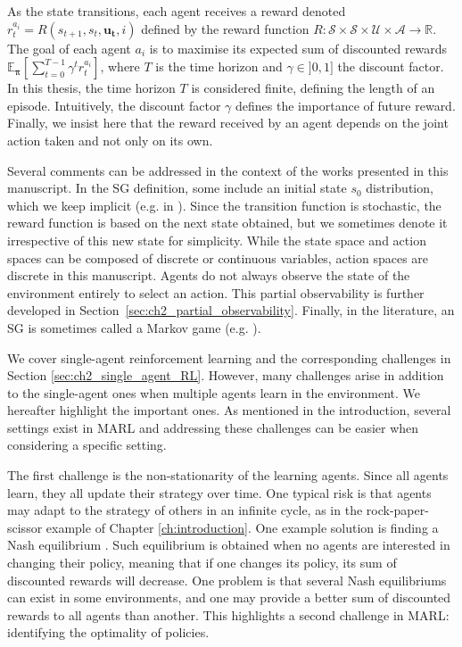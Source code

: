 As the state transitions, each agent receives a reward denoted $r_t^{a_i} = R(s_{t+1}, s_t, \mathbf{u_t}, i)$ defined by the reward function $R: \mathcal{S} \times \mathcal{S} \times \mathcal{U} \times \mathcal{A} \rightarrow \mathbb{R}$.
The goal of each agent $a_i$ is to maximise its expected sum of discounted rewards $\mathbb{E}_{\mathbf{\pi}}\left[ \sum_{t=0}^{T-1} \gamma^t r^{a_i}_t \right]$, where $T$ is the time horizon and $\gamma \in ]0, 1]$ the discount factor.
In this thesis, the time horizon $T$ is considered finite, defining the length of an episode.
Intuitively, the discount factor $\gamma$ defines the importance of future reward.
Finally, we insist here that the reward received by an agent depends on the joint action taken and not only on its own.

Several comments can be addressed in the context of the works presented in this manuscript.
In the SG definition, some include an initial state $s_0$ distribution, which we keep implicit (e.g. in \citep{marl-book}).
Since the transition function is stochastic, the reward function is based on the next state obtained, but we sometimes denote it irrespective of this new state for simplicity.
While the state space and action spaces can be composed of discrete or continuous variables, action spaces are discrete in this manuscript.
Agents do not always observe the state of the environment entirely to select an action.
This partial observability is further developed in Section~\ref{sec:ch2_partial_observability}.
Finally, in the literature, an SG is sometimes called a Markov game (e.g. \citep{MarkovGames}).

We cover single-agent reinforcement learning and the corresponding challenges in Section \ref{sec:ch2_single_agent_RL}.
However, many challenges arise in addition to the single-agent ones when multiple agents learn in the environment.
We hereafter highlight the important ones.
As mentioned in the introduction, several settings exist in MARL and addressing these challenges can be easier when considering a specific setting.

The first challenge is the non-stationarity of the learning agents.
Since all agents learn, they all update their strategy over time.
One typical risk is that agents may adapt to the strategy of others in an infinite cycle, as in the rock-paper-scissor example of Chapter \ref{ch:introduction}.
One example solution is finding a Nash equilibrium \citep{nash1950equilibrium}.
Such equilibrium is obtained when no agents are interested in changing their policy, meaning that if one changes its policy, its sum of discounted rewards will decrease.
One problem is that several Nash equilibriums can exist in some environments, and one may provide a better sum of discounted rewards to all agents than another.
This highlights a second challenge in MARL: identifying the optimality of policies.

